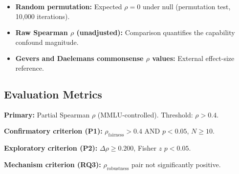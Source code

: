 \begin{itemize}
\item \textbf{Random permutation:} Expected $\rho = 0$ under null (permutation test, 10,000 iterations).
\item \textbf{Raw Spearman $\rho$ (unadjusted):} Comparison quantifies the capability confound magnitude.
\item \textbf{Gevers and Daelemans \citeyear{GeversAndDaelemans2026} commonsense $\rho$ values:} External effect-size reference.
\end{itemize}

\subsection{Evaluation Metrics}

\textbf{Primary:} Partial Spearman $\rho$ (MMLU-controlled). Threshold: $\rho > 0.4$.

\textbf{Confirmatory criterion (P1):} $\rho_{\text{fairness}} > 0.4$ AND $p < 0.05$, $N \geq 10$.

\textbf{Exploratory criterion (P2):} $\Delta\rho \geq 0.200$, Fisher $z$ $p < 0.05$.

\textbf{Mechanism criterion (RQ3):} $\rho_{\text{robustness}}$ pair not significantly positive.
